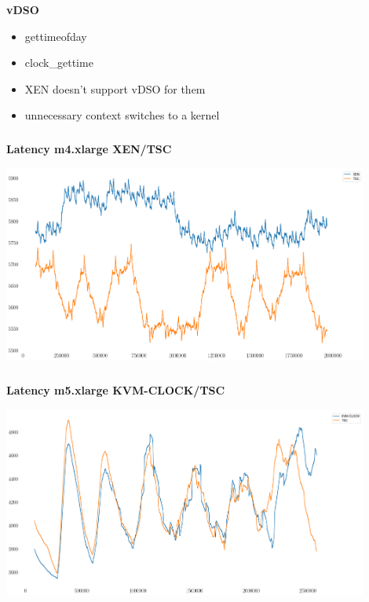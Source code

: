 \documentclass[usenames,dvipsnames, 18pt, compress, aspectratio=169]{beamer}
\begin{document}
\begin{frame}
    \frametitle{}
    \begin{center}
    \textbf{vDSO}

        \begin{itemize}[label={\MVRightarrow}]
            \item gettimeofday
            \item clock\_gettime
            \item XEN doesn't support vDSO for them
            \item unnecessary context switches to a kernel
        \end{itemize}

    \end{center}
\end{frame}

\begin{frame}
    \frametitle{}
    \begin{center}
    \textbf{Latency m4.xlarge XEN/TSC}

        \includegraphics[width=0.9\textwidth,center]{m4_clock_source.png}

    \end{center}
\end{frame}

\begin{frame}
    \frametitle{}
    \begin{center}
    \textbf{Latency m5.xlarge KVM-CLOCK/TSC}

        \includegraphics[width=0.9\textwidth,center]{m5_clock_source.png}

    \end{center}
\end{frame}
\end{document}
